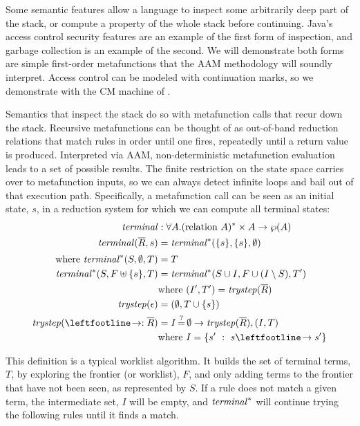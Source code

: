 Some semantic features allow a language to inspect some arbitrarily deep part of the stack, or compute a property of the whole stack before continuing.
%
Java's access control security features are an example of the first form of inspection, and garbage collection is an example of the second.
%
We will demonstrate both forms are simple first-order metafunctions that the AAM methodology will soundly interpret.
%
Access control can be modeled with continuation marks, so we demonstrate with the CM machine of \citeauthor{dvanhorn:Clements2004Tailrecursive}.

Semantics that inspect the stack do so with metafunction calls that recur down the stack.
%
Recursive metafunctions can be thought of as out-of-band reduction relations that match rules in order until one fires, repeatedly until a return value is produced.
%
Interpreted via AAM, non-deterministic metafunction evaluation leads to a set of possible results.
%
The finite restriction on the state space carries over to metafunction inputs, so we can always detect infinite loops and bail out of that execution path.
%
Specifically, a metafunction call can be seen as an initial state, $s$, in a reduction system for which we can compute all terminal states:
\begin{align*}
  \terminal &: \forall A. (\text{relation } A)^* \times A \to \wp(A) \\
  \terminal(\overline{R},s) &= \terminalaux(\set{s},\set{s},\emptyset) \\[2pt]
  \text{where } \terminalaux(S, \emptyset, T) &= T \\
   \terminalaux(S, F \uplus \set{s}, T) &= \terminalaux(S\cup I, F \cup (I \setminus S), T') \\
   & \text{where } (I',T') = \trystep(\overline{R}) \\
   \trystep(\epsilon) &= (\emptyset,T\cup\set{s}) \\
   \trystep(\stepto:\overline{R}) &= I\deceq\emptyset \to \trystep(\overline{R}), (I, T) \\
    & \text{where } I = \setbuild{s'}{s \stepto s'}
\end{align*}

This definition is a typical worklist algorithm.
%
It builds the set of terminal terms, $T$, by exploring the frontier (or worklist), $F$, and only adding terms to the frontier that have not been seen, as represented by $S$.
%
If a rule does not match a given term, the intermediate set, $I$ will be empty, and $\mathit{terminal}^*$ will continue trying the following rules until it finds a match.

